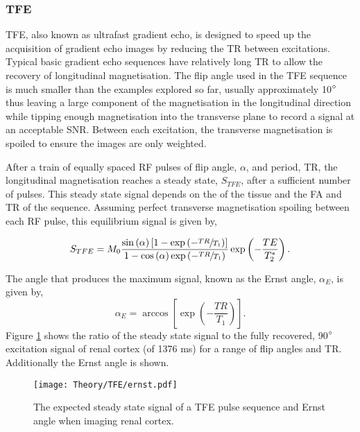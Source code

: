 \subsubsection{\ac*{TFE}}
\ac{TFE}, also known as ultrafast gradient echo, is designed to speed up the acquisition of gradient echo images by reducing the \ac{TR} between excitations. Typical basic gradient echo sequences have relatively long \ac{TR} to allow the recovery of longitudinal magnetisation. The flip angle used in the \ac{TFE} sequence is much smaller than the examples explored so far, usually approximately 10$\degree$ thus leaving a large component of the magnetisation in the longitudinal direction while tipping enough magnetisation into the transverse plane to record a signal at an acceptable \ac{SNR}. Between each excitation, the transverse magnetisation is spoiled to ensure the images are only \tone weighted. 

After a train of equally spaced \ac{RF} pulses of flip angle, $\alpha$, and period, \ac{TR}, the longitudinal magnetisation reaches a steady state, $S_{TFE}$, after a sufficient number of pulses. This steady state signal depends on the \tone of the tissue and the \ac{FA} and \ac{TR} of the sequence. Assuming perfect transverse magnetisation spoiling between each \ac{RF} pulse, this equilibrium signal is given by,

\begin{equation}
	S_{TFE} = M_0 \frac{\sin \left( \alpha \right) \left[ 1 - \exp \left( -\sfrac{TR}{T_1}\right) \right]}{1-\cos \left( \alpha \right) \exp \left( -\sfrac{TR}{T_1}\right)} \exp \left( - \frac{TE}{T_2^*}\right).
	\label{eq:tfe_signal}
\end{equation}

The angle that produces the maximum signal, known as the Ernst angle, $\alpha_E$, is given by,
\begin{equation}
	\alpha_E = \arccos \left[ \exp \left( -\frac{TR}{T_1}\right)\right].
	\label{eq:theory_ernst}
\end{equation}
Figure \ref{fig:theory_ernst} shows the ratio of the steady state signal to the fully recovered, 90$\degree${ } excitation signal of renal cortex (\tone of 1376 ms) for a range of flip angles and \ac{TR}. Additionally the Ernst angle is shown. 
\begin{figure}[H]
	\centering
	\texttt{[image: Theory/TFE/ernst.pdf]}
	\caption{The expected steady state signal of a \ac{TFE} pulse sequence and Ernst angle when imaging renal cortex.}
	\label{fig:theory_ernst}	
\end{figure}

